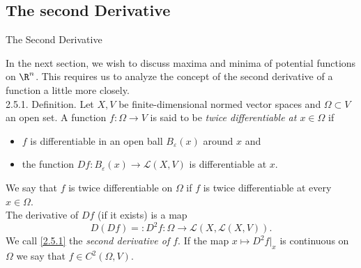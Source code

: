 \documentclass[smaller,hyperref={CJKbookmarks=true}]{beamer}
\begin{document}
\subsection{The second Derivative}
\begin{frame}[c]
\begin{spacing}{2.5}
\tableofcontents[sectionstyle=hide,subsectionstyle=show/shaded/hide]
\end{spacing}
\end{frame}
\begin{frame}[t]{The Second Derivative}
\begin{spacing}{1}
In the next section, we wish to discuss maxima and minima of potential
functions on $\R^n$. This requires us to analyze the concept of the second
derivative of a function a little more closely.\\[5pt]
\alert{2.5.1. Definition.} Let $X,V$ be finite-dimensional normed vector spaces and $\Omega\subset V$ an open set. A function $f:\Omega\to V$ is said to be \emph{twice dif{}ferentiable at $x\in\Omega$} if
\begin{itemize}
  \item $f$ is dif{}ferentiable in an open ball $B_{\varepsilon}(x)$ around $x$ and
  \item the function $Df:B_\varepsilon(x)\to\mathcal{L}(X,V)$ is dif{}ferentiable at $x$.
\end{itemize}
We say that $f$ is twice dif{}ferentiable on $\Omega$ if $f$ is twice dif{}ferentiable at every $x\in\Omega$.\\[5pt]
The derivative of $Df$ (if it exists) is a map
\setcounter{equation}{0}
\begin{equation}\label{2.5.1}
  D(Df)=:D^2f:\Omega\to\mathcal{L}(X,\mathcal{L}
  (X,V)).
\end{equation}
We call \eqref{2.5.1} the \emph{second derivative of $f$}. If the map $x\mapsto D^2f|_x$ is continuous on $\Omega$ we say that $f\in C^2(\Omega,V)$.
\end{spacing}
\end{frame}
\end{document}
